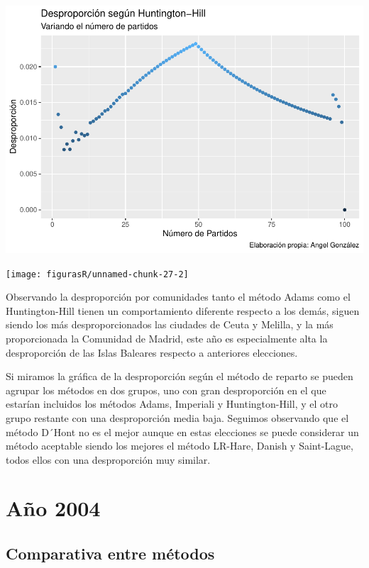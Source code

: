 \documentclass[12pt,a4paper,]{book}
\numberwithin{dummy}{section}
\theoremstyle{ocrenumbox}
\theoremstyle{blacknumex}
\theoremstyle{blacknumbox}
\theoremstyle{ocrenum}
\theoremstyle{ocrenum}
\begin{document}
\begin{center}\includegraphics[width=1\linewidth]{figurasR/unnamed-chunk-27-1} \end{center}

\begin{center}\texttt{[image: figurasR/unnamed-chunk-27-2]} \end{center}

Observando la desproporción por comunidades tanto el método Adams como
el Huntington-Hill tienen un comportamiento diferente respecto a los
demás, siguen siendo los más desproporcionados las ciudades de Ceuta y
Melilla, y la más proporcionada la Comunidad de Madrid, este año es
especialmente alta la desproporción de las Islas Baleares respecto a
anteriores elecciones.

Si miramos la gráfica de la desproporción según el método de reparto se
pueden agrupar los métodos en dos grupos, uno con gran desproporción en
el que estarían incluidos los métodos Adams, Imperiali y
Huntington-Hill, y el otro grupo restante con una desproporción media
baja. Seguimos observando que el método D´Hont no es el mejor aunque en
estas elecciones se puede considerar un método aceptable siendo los
mejores el método LR-Hare, Danish y Saint-Lague, todos ellos con una
desproporción muy similar.

\hypertarget{auxf1o-2004}{%
\section{Año 2004}\label{auxf1o-2004}}

\hypertarget{comparativa-entre-muxe9todos-8}{%
\subsection{Comparativa entre
métodos}\label{comparativa-entre-muxe9todos-8}}
\end{document}
